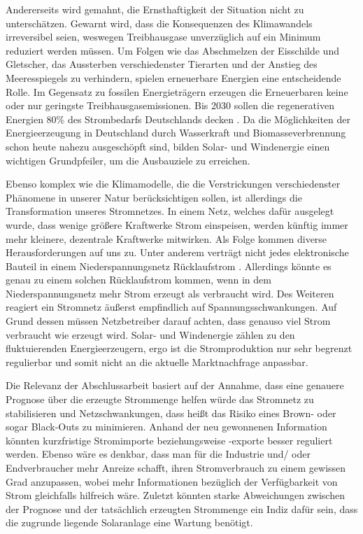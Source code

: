 \documentclass[12pt, a4paper]{article}
\begin{document}
Andererseits wird gemahnt, die Ernsthaftigkeit der Situation nicht zu unterschätzen. Gewarnt wird, dass die Konsequenzen des Klimawandels irreversibel seien, weswegen Treibhausgase unverzüglich auf ein Minimum reduziert werden müssen. Um Folgen wie das Abschmelzen der Eisschilde und Gletscher, das Aussterben verschiedenster Tierarten und der Anstieg des Meeresspiegels zu verhindern, spielen erneuerbare Energien eine entscheidende Rolle. Im Gegensatz zu fossilen Energieträgern erzeugen die Erneuerbaren keine oder nur geringste Treibhausgasemissionen. Bis 2030 sollen die regenerativen Energien 80\% des Strombedarfs Deutschlands decken \cite{faz2023wind}. Da die Möglichkeiten der Energieerzeugung in Deutschland durch Wasserkraft und Biomasseverbrennung schon heute nahezu ausgeschöpft sind, bilden Solar- und Windenergie einen wichtigen Grundpfeiler, um die Ausbauziele zu erreichen. 

Ebenso komplex wie die Klimamodelle, die die Verstrickungen verschiedenster Phänomene in unserer Natur berücksichtigen sollen, ist allerdings die Transformation unseres Stromnetzes. In einem Netz, welches dafür ausgelegt wurde, dass wenige größere Kraftwerke Strom einspeisen, werden künftig immer mehr kleinere, dezentrale Kraftwerke mitwirken. Als Folge kommen diverse Herausforderungen auf uns zu. Unter anderem verträgt nicht jedes elektronische Bauteil in einem Niederspannungsnetz Rücklaufstrom \cite{pukhrem2017enhanced}. Allerdings könnte es genau zu einem solchen Rücklaufstrom kommen, wenn in dem Niederspannungsnetz mehr Strom erzeugt als verbraucht wird. Des Weiteren reagiert ein Stromnetz äußerst empfindlich auf Spannungsschwankungen. Auf Grund dessen müssen Netzbetreiber darauf achten, dass genauso viel Strom verbraucht wie erzeugt wird. Solar- und Windenergie zählen zu den fluktuierenden Energieerzeugern, ergo ist die Stromproduktion nur sehr begrenzt regulierbar und somit nicht an die aktuelle Marktnachfrage anpassbar.

Die Relevanz der Abschlussarbeit basiert auf der Annahme, dass eine genauere Prognose über die erzeugte Strommenge helfen würde das Stromnetz zu stabilisieren und Netzschwankungen, dass heißt das Risiko eines Brown- oder sogar Black-Outs zu minimieren. Anhand der neu gewonnenen Information könnten kurzfristige Stromimporte beziehungsweise -exporte besser reguliert werden. Ebenso wäre es denkbar, dass man für die Industrie und/ oder Endverbraucher mehr Anreize schafft, ihren Stromverbrauch zu einem gewissen Grad anzupassen, wobei mehr Informationen bezüglich der Verfügbarkeit von Strom gleichfalls hilfreich wäre. Zuletzt könnten starke Abweichungen zwischen der Prognose und der tatsächlich erzeugten Strommenge ein Indiz dafür sein, dass die zugrunde liegende Solaranlage eine Wartung benötigt.
\end{document}
